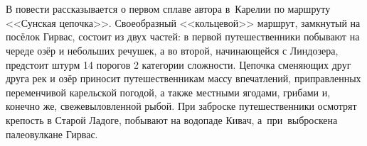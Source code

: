 \chapter*{}


В повести рассказывается о первом сплаве автора в~Карелии по маршруту <<Сунская цепочка>>\cite{Шилов}. Своеобразный <<кольцевой>> маршрут, замкнутый на посёлок Гирвас, состоит из двух частей: в первой путешественники побывают на череде озёр и небольших речушек, а во второй, начинающейся с Линдозера, предстоит штурм 14 порогов 2 категории сложности. Цепочка сменяющих друг друга рек и озёр приносит путешественникам массу впечатлений, приправленных переменчивой карельской погодой, а также местными ягодами, грибами и, конечно же, свежевыловленной рыбой. При заброске путешественники осмотрят крепость в Старой Ладоге, побывают на водопаде Кивач, а~при~выброске\mdash на палеовулкане Гирвас.



